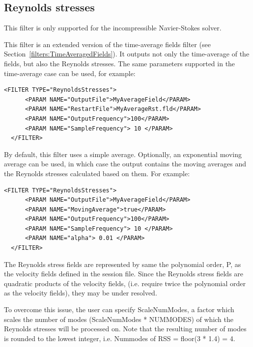 \subsection{Reynolds stresses}\label{filters:ReynoldsStresses}

\begin{notebox}
  This filter is only supported for the incompressible Navier-Stokes solver.
\end{notebox}

This filter is an extended version of the time-average fields filter (see Section~\ref{filters:TimeAveragedFields}). It outputs
not only the time-average of the fields, but also the Reynolds stresses.
The same parameters supported in the time-average case can be used,
for example:

\begin{lstlisting}[style=XMLStyle,gobble=2]
  <FILTER TYPE="ReynoldsStresses">
      <PARAM NAME="OutputFile">MyAverageField</PARAM>
      <PARAM NAME="RestartFile">MyAverageRst.fld</PARAM>
      <PARAM NAME="OutputFrequency">100</PARAM>
      <PARAM NAME="SampleFrequency"> 10 </PARAM>
  </FILTER>
\end{lstlisting}

By default, this filter uses a simple average. Optionally, an exponential
moving average can be used, in which case the output contains the moving
averages and the Reynolds stresses calculated based on them. For example:

\begin{lstlisting}[style=XMLStyle,gobble=2]
  <FILTER TYPE="ReynoldsStresses">
      <PARAM NAME="OutputFile">MyAverageField</PARAM>
      <PARAM NAME="MovingAverage">true</PARAM>
      <PARAM NAME="OutputFrequency">100</PARAM>
      <PARAM NAME="SampleFrequency"> 10 </PARAM>
      <PARAM NAME="alpha"> 0.01 </PARAM>
  </FILTER>
\end{lstlisting}

The Reynolds stress fields are represented by same the 
polynomial order, P, as the velocity fields defined in the session file.
Since the Reynolds stress fields are quadratic products of the velocity fields, 
(i.e. require twice the polynomial order as the velocity fields), they may be 
under resolved.

To overcome this issue, the user can specify ScaleNumModes, a factor which scales
the number of modes (ScaleNumModes * NUMMODES) of which the Reynolds stresses will
be processed on.
Note that the resulting number of modes is rounded to the lowest integer,
i.e. Nummodes of RSS = floor(3 * 1.4) = 4.

